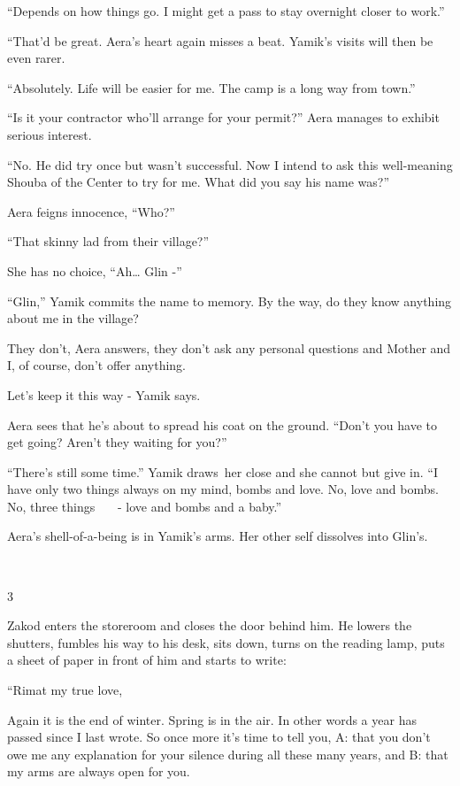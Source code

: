 \documentclass[12pt]{book}
\begin{document}
{}``Depends on how things go. I might get a pass to stay overnight closer to work.''

{}``That'd be great.{\textquotedbl} Aera's heart again misses a beat. Yamik's visits will then be even rarer.

{}``Absolutely. Life will be easier for me. The camp is a long way from town.''

{}``Is it your contractor who'll arrange for your permit?'' Aera manages to exhibit serious interest.

{}``No. He did try once but wasn't successful. Now I intend to ask this well-meaning Shouba of the Center to try for me.
What did you say his name was?''

Aera feigns innocence, ``Who?''~

{}``That skinny lad from their village?''

She has no choice, ``Ah{\dots} Glin -''

{}``Glin,'' Yamik commits the name to memory. {\textquotedbl}By the way, do they know anything about me in the
village?{\textquotedbl}

{\textquotedbl}They don't{\textquotedbl}, Aera answers, {\textquotedbl}they don't ask any personal questions and Mother
and I, of course, don't offer anything.{\textquotedbl}

{\textquotedbl}Let's keep it this way -{\textquotedbl} Yamik says.

Aera sees that he's about to spread his coat on the ground. ``Don't you have to get going? Aren't they waiting for
you?''

{}``There's still some time.'' Yamik draws~her close and she cannot but give in. ``I have only two things always on my
mind, bombs and love. No, love and bombs. No, three things \ \ \ {}- love and bombs and a baby.''

Aera's shell-of-a-being is in Yamik's arms.{ }Her other self dissolves into Glin's.

~

3

Zakod enters the storeroom and closes the door behind him. He lowers the shutters, fumbles his way to his desk, sits
down, turns on the reading lamp, puts a sheet of paper in front of him and starts to write:

{}``Rimat my true love,

Again it is the end of winter. Spring is in the air. In other words a year has passed since I last wrote. So once more
it's time to tell you, A: that you don't owe me any explanation for your silence during all these many years, and B:
that my arms are always open for you.
\end{document}
